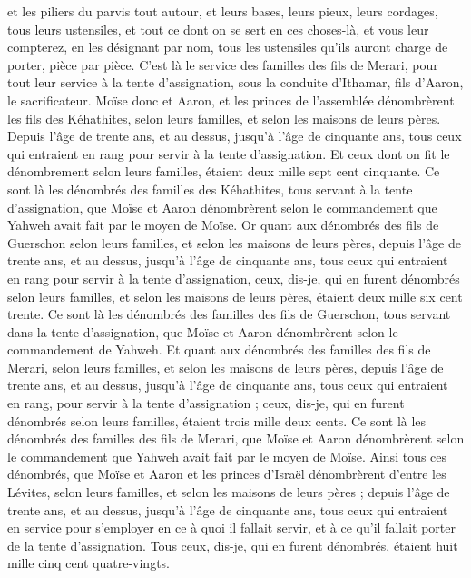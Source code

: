 \begin{multicols}{2}
et les piliers du parvis tout autour, et leurs bases, leurs pieux, leurs cordages, tous leurs ustensiles, et tout ce dont on se sert en ces choses-là, et vous leur compterez, en les désignant par nom, tous les ustensiles qu'ils auront charge de porter, pièce par pièce.
C'est là le service des familles des fils de Merari, pour tout leur service à la tente d'assignation, sous la conduite d'Ithamar, fils d'Aaron, le sacrificateur.
Moïse donc et Aaron, et les princes de l'assemblée dénombrèrent les fils des Kéhathites, selon leurs familles, et selon les maisons de leurs pères.
Depuis l'âge de trente ans, et au dessus, jusqu'à l'âge de cinquante ans, tous ceux qui entraient en rang pour servir à la tente d'assignation.
Et ceux dont on fit le dénombrement selon leurs familles, étaient deux mille sept cent cinquante.
Ce sont là les dénombrés des familles des Kéhathites, tous servant à la tente d'assignation, que Moïse et Aaron dénombrèrent selon le commandement que Yahweh avait fait par le moyen de Moïse.
Or quant aux dénombrés des fils de Guerschon selon leurs familles, et selon les maisons de leurs pères,
depuis l'âge de trente ans, et au dessus, jusqu'à l'âge de cinquante ans, tous ceux qui entraient en rang pour servir à la tente d'assignation,
ceux, dis-je, qui en furent dénombrés selon leurs familles, et selon les maisons de leurs pères, étaient deux mille six cent trente.
Ce sont là les dénombrés des familles des fils de Guerschon, tous servant dans la tente d'assignation, que Moïse et Aaron dénombrèrent selon le commandement de Yahweh.
Et quant aux dénombrés des familles des fils de Merari, selon leurs familles, et selon les maisons de leurs pères,
depuis l'âge de trente ans, et au dessus, jusqu'à l'âge de cinquante ans, tous ceux qui entraient en rang, pour servir à la tente d'assignation ;
ceux, dis-je, qui en furent dénombrés selon leurs familles, étaient trois mille deux cents.
Ce sont là les dénombrés des familles des fils de Merari, que Moïse et Aaron dénombrèrent selon le commandement que Yahweh avait fait par le moyen de Moïse.
Ainsi tous ces dénombrés, que Moïse et Aaron et les princes d'Israël dénombrèrent d'entre les Lévites, selon leurs familles, et selon les maisons de leurs pères ;
depuis l'âge de trente ans, et au dessus, jusqu'à l'âge de cinquante ans, tous ceux qui entraient en service pour s'employer en ce à quoi il fallait servir, et à ce qu'il fallait porter de la tente d'assignation.
Tous ceux, dis-je, qui en furent dénombrés, étaient huit mille cinq cent quatre-vingts.

\end{multicols}
